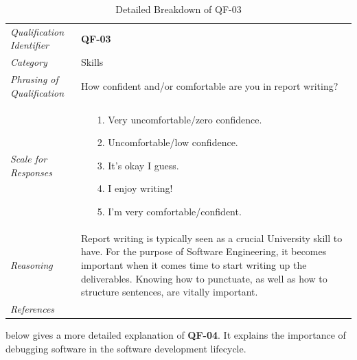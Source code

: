\documentclass[12pt,letterpaper]{article}
\begin{document}
\begin{table}[H]
	\caption{Detailed Breakdown of QF-03}
	\begin{tabu} to 
		\toprule
		Qualification Identifier & {\bf QF-03}\\
		Category & Skills \\
		Phrasing of Qualification & How confident and/or comfortable are you in report writing? \\
		Scale for Responses &
		\begin{minipage}[t]{\linewidth}
			\begin{enumerate}
				\item[1.] Very uncomfortable/zero confidence. 
				\item[2.] Uncomfortable/low confidence.
				\item[3.] It's okay I guess.
				\item[4.] I enjoy writing!
				\item[5.] I'm very comfortable/confident.
			\end{enumerate}
		\end{minipage}\\
		Reasoning & Report writing is typically seen as a crucial University skill to have. For the purpose of Software Engineering, it becomes important when it comes time to start writing up the deliverables. Knowing how to punctuate, as well as how to structure sentences, are vitally important.\\
		References & \\
		\toprule
	\end{tabu}
\end{table}

 below gives a more detailed explanation of {\bf QF-04}. It explains the importance of debugging software in the software development lifecycle.
\end{document}
